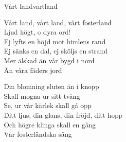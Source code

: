 \begin{song}{Vårt land}{vartland}
\begin{vers}
Vårt land, vårt land, vårt fosterland\\
Ljud högt, o dyra ord!\\
Ej lyfts en höjd mot himlens rand\\
Ej sänks en dal, ej sköljs en strand\\
Mer älskad än vår bygd i nord\\
Än våra fäders jord\\
\end{vers}
\begin{vers}
Din blomning sluten än i knopp\\
Skall mogna ur sitt tvång\\
Se, ur vår kärlek skall gå opp\\
Ditt ljus, din glans, din fröjd, ditt hopp\\
Och högre klinga skall en gång\\
Vår fosterländska sång\\
\end{vers}
\end{song}
